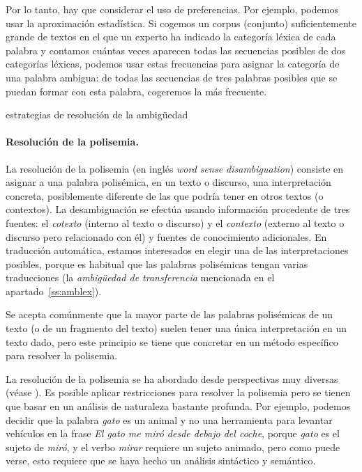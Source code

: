 Por lo tanto, hay que considerar el uso de preferencias. Por ejemplo, podemos usar la aproximación estadística. Si cogemos un corpus (conjunto) suficientemente grande de textos en el que un experto ha indicado la categoría léxica de cada palabra y contamos cuántas veces aparecen todas las secuencias posibles de dos categorías léxicas, podemos usar estas frecuencias para asignar la categoría de una palabra ambigua: de todas las secuencias de tres palabras posibles que se puedan formar con esta palabra, cogeremos la más frecuente. 

\begin{persabermes}{estrategias de resolución de la ambigüedad} \paragraph{Resolución de la polisemia.} La resolución de la polisemia (en inglés \emph{word sense disambiguation}) consiste en asignar a una palabra polisémica, en un texto o discurso, una interpretación concreta, posiblemente diferente de las que podría tener en otros textos (o contextos). La desambiguación se efectúa usando información procedente de tres fuentes: el \emph{cotexto} (interno al texto o discurso) y el \emph{contexto} (externo al texto o discurso pero relacionado con él) y fuentes de conocimiento adicionales. En traducción automática, estamos interesados en elegir una de las interpretaciones posibles, porque es habitual que las palabras polisémicas tengan varias traducciones (la \emph{ambigüedad de transferencia} mencionada en el apartado~\ref{ss:amblex}). 

Se acepta comúnmente que la mayor parte de las palabras polisémicas de un texto (o de un fragmento del texto) suelen tener una única interpretación en un texto dado, pero este principio se tiene que concretar en un método específico para resolver la polisemia. 

La resolución de la polisemia se ha abordado desde perspectivas muy diversas (véase \citet{ide98j}). Es posible aplicar restricciones para resolver la polisemia pero se tienen que basar en un análisis de naturaleza bastante profunda. Por ejemplo, podemos decidir que la palabra \emph{gato} es un animal y no una herramienta para levantar vehículos en la frase \emph{El gato me miró desde debajo del coche}, porque \emph{gato} es el sujeto de \emph{miró}, y el verbo \emph{mirar} requiere un sujeto animado, pero como puede verse, esto requiere que se haya hecho un análisis sintáctico y semántico. 


\end{persabermes}
